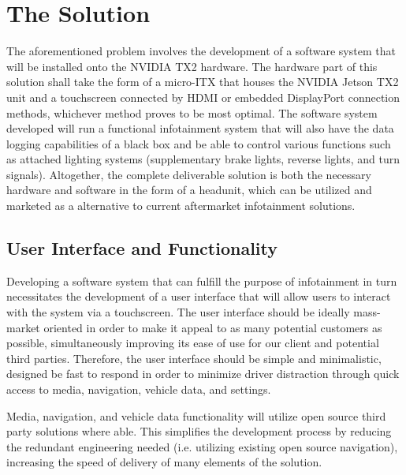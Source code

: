 \documentclass[onecolumn, draftclsnofoot,10pt, compsoc]{IEEEtran}
\begin{document}
\section{The Solution}
The aforementioned problem involves the development of a software system that will be installed onto the NVIDIA TX2 hardware. The hardware part of this solution shall take the form of a micro-ITX that houses the NVIDIA Jetson TX2 unit and a touchscreen connected by HDMI or embedded DisplayPort connection methods, whichever method proves to be most optimal. The software system developed will run a functional infotainment system that will also have the data logging capabilities of a black box and be able to control various functions such as attached lighting systems (supplementary brake lights, reverse lights, and turn signals). Altogether, the complete deliverable solution is both the necessary hardware and software in the form of a headunit, which can be utilized and marketed as a alternative to current aftermarket infotainment solutions.\par

\subsection{User Interface and Functionality}
Developing a software system that can fulfill the purpose of infotainment in turn necessitates the development of a user interface that will allow users to interact with the system via a touchscreen. The user interface should be ideally mass-market oriented in order to make it appeal to as many potential customers as possible, simultaneously improving its ease of use for our client and potential third parties. Therefore, the user interface should be simple and minimalistic, designed be fast to respond in order to minimize driver distraction through quick access to media, navigation, vehicle data, and settings.\par
Media, navigation, and vehicle data functionality will utilize open source third party solutions where able. This simplifies the development process by reducing the redundant engineering needed (i.e. utilizing existing open source navigation), increasing the speed of delivery of many elements of the solution.\par
\end{document}
